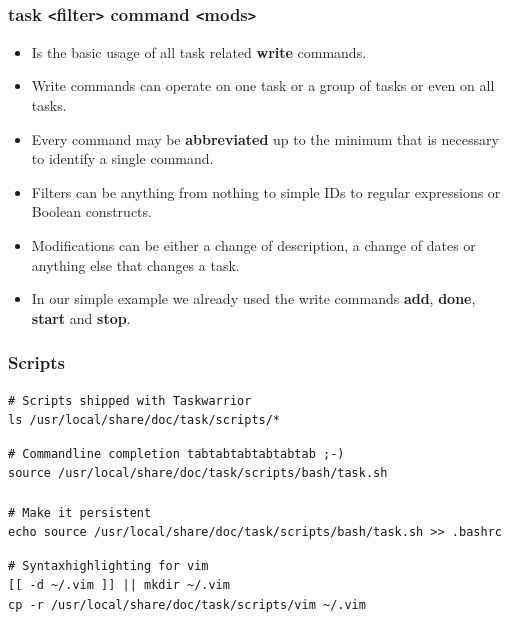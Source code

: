 \documentclass[t]{beamer}
\begin{document}
\begin{frame}[fragile]\frametitle{task {\tt<}filter{\tt>} command {\tt<}mods{\tt>}}
    \begin{itemize}
        \item Is the basic usage of all task related \textbf{write} commands.
        \item Write commands can operate on one task or a group of tasks or even on all tasks.
        \item Every command may be \textbf{abbreviated} up to the minimum that is necessary to identify a single command.
        \item Filters can be anything from nothing to simple IDs to regular expressions or Boolean constructs.
        \item Modifications can be either a change of description, a change of dates or anything else that changes a task.
        \item In our simple example we already used the write commands \textbf{add}, \textbf{done}, \textbf{start} and \textbf{stop}.
    \end{itemize}
\end{frame}

\begin{frame}[fragile]\frametitle{Scripts}
    \vfill
    \begin{lstlisting}
# Scripts shipped with Taskwarrior
ls /usr/local/share/doc/task/scripts/*\end{lstlisting}

\begin{lstlisting}
# Commandline completion tabtabtabtabtabtab ;-)
source /usr/local/share/doc/task/scripts/bash/task.sh

# Make it persistent
echo source /usr/local/share/doc/task/scripts/bash/task.sh >> .bashrc\end{lstlisting}

\begin{lstlisting}
# Syntaxhighlighting for vim
[[ -d ~/.vim ]] || mkdir ~/.vim
cp -r /usr/local/share/doc/task/scripts/vim ~/.vim\end{lstlisting}
\end{frame}
\end{document}
